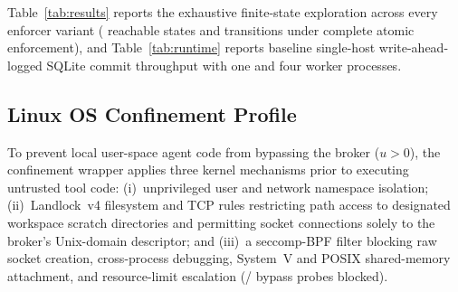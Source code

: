


Table~\ref{tab:results} reports the exhaustive finite-state exploration across every enforcer variant (\CheckedStates{} reachable states and \CheckedEdges{} transitions under complete atomic enforcement), and Table~\ref{tab:runtime} reports baseline single-host write-ahead-logged SQLite commit throughput with one and four worker processes.

\subsection{Linux OS Confinement Profile}

To prevent local user-space agent code from bypassing the broker (\(u > 0\)), the confinement wrapper applies three kernel mechanisms prior to executing untrusted tool code: (i)~unprivileged user and network namespace isolation; (ii)~Landlock~v4 filesystem and TCP rules restricting path access to designated workspace scratch directories and permitting socket connections solely to the broker's Unix-domain descriptor; and (iii)~a seccomp-BPF filter blocking raw socket creation, cross-process debugging, System~V and POSIX shared-memory attachment, and resource-limit escalation (\VTwoProbes/\VTwoProbes{} bypass probes blocked).
